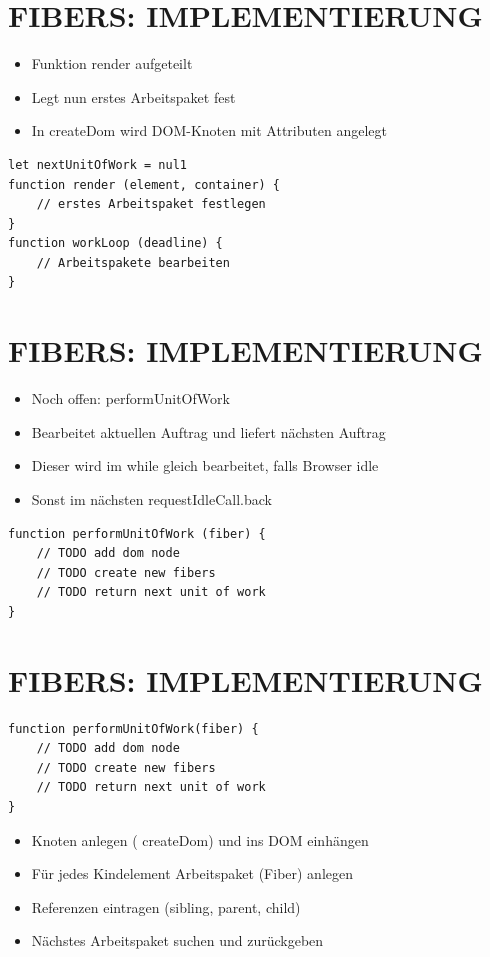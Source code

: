 \section*{FIBERS: IMPLEMENTIERUNG}
\begin{itemize}
  \item Funktion render aufgeteilt
  \item Legt nun erstes Arbeitspaket fest
  \item In createDom wird DOM-Knoten mit Attributen angelegt
\end{itemize}

\begin{verbatim}
let nextUnitOfWork = nul1
function render (element, container) {
    // erstes Arbeitspaket festlegen
}
function workLoop (deadline) {
    // Arbeitspakete bearbeiten
}
\end{verbatim}

\section*{FIBERS: IMPLEMENTIERUNG}
\begin{itemize}
  \item Noch offen: performUnitOfWork
  \item Bearbeitet aktuellen Auftrag und liefert nächsten Auftrag
  \item Dieser wird im while gleich bearbeitet, falls Browser idle
  \item Sonst im nächsten requestIdleCall.back
\end{itemize}

\begin{verbatim}
function performUnitOfWork (fiber) {
    // TODO add dom node
    // TODO create new fibers
    // TODO return next unit of work
}
\end{verbatim}

\section*{FIBERS: IMPLEMENTIERUNG}
\begin{verbatim}
function performUnitOfWork(fiber) {
    // TODO add dom node
    // TODO create new fibers
    // TODO return next unit of work
}
\end{verbatim}

\begin{itemize}
  \item Knoten anlegen ( createDom) und ins DOM einhängen
  \item Für jedes Kindelement Arbeitspaket (Fiber) anlegen
  \item Referenzen eintragen (sibling, parent, child)
  \item Nächstes Arbeitspaket suchen und zurückgeben
\end{itemize}

